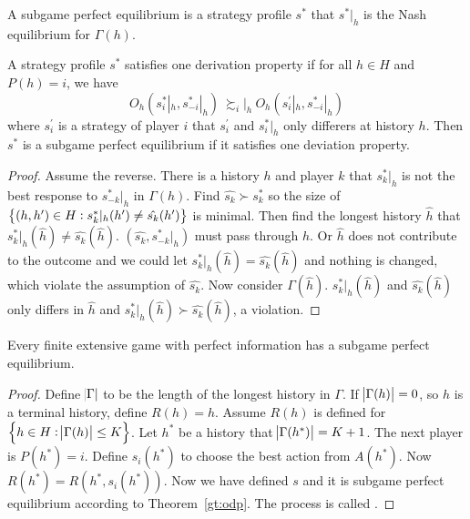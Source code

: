 \begin{definition}
    A subgame perfect equilibrium is a strategy profile $s^*$ that $s^*|_h$ is the Nash equilibrium for $\Gamma(h)$.
\end{definition}

\begin{theorem}\label{gt:odp}
    A strategy profile $s^*$ satisfies one derivation property if for all $h\in H$ and $P(h) =i$, we have 
    \begin{equation*}
        O_h(s_i^*|_h, s_{-i}^* |_h)\ {\succsim_i}|_h\ O_h(s_i^{'}|_h, s_{-i}^* |_h)
    \end{equation*}
    where $s_i^{'}$ is a strategy of player $i$ that $s_i^{'}$ and $s_i^* |_h$ only differers at history $h$. Then $s^*$ is a subgame perfect equilibrium if it satisfies one deviation property.
\end{theorem}
\begin{proof}
    Assume the reverse. There is a history $h$ and player $k$ that $s_k^* |_h$ is not the best response to $s_{-k}^* |_h$ in $\Gamma(h)$. Find $\hat{s_k} \succ s_k^*$ so the size of $\set{(h,h') \in H: s_k^* |_h (h') \neq \hat{s_k}(h')}$ is minimal. Then find the longest history $\hat{h}$ that $s_k^* |_h (\hat{h}) \neq \hat{s_k}(\hat{h})$. $(\hat{s_k}, s_{-k}^* |_h)$ must pass through $\hat{h}$. Or $\hat{h}$ does not contribute to the outcome and we could let $s_k^* |_h (\hat{h}) = \hat{s_k}(\hat{h})$ and nothing is changed, which violate the assumption of $\hat{s_k}$. Now consider $\Gamma(\hat{h})$. $s_k^* |_h (\hat{h})$ and $\hat{s_k}(\hat{h})$ only differs in $\hat{h}$ and $s_k^* |_h (\hat{h}) \succ \hat{s_k}(\hat{h})$, a violation.
\end{proof}

\begin{theorem}
    Every finite extensive game with perfect information has a subgame perfect equilibrium.
\end{theorem}
\begin{proof}
    Define $\abs{\Gamma}$ to be the length of the longest history in $\Gamma$. If $\abs{\Gamma(h)} = 0$, so $h$ is a terminal history, define $R(h) = h$. Assume $R(h)$ is defined for $\set{h \in H: \abs{\Gamma(h)} \leq K}$. Let $h^*$ be a history that $\abs{\Gamma(h^*)} = K+1$. The next player is $P(h^*) = i$. Define $s_i(h^*)$ to choose the best action from $A(h^*)$. Now $R(h^*) = R(h^*, s_i(h^*))$. Now we have defined $s$ and it is subgame perfect equilibrium according to Theorem~\ref{gt:odp}. The process is called .
\end{proof}










